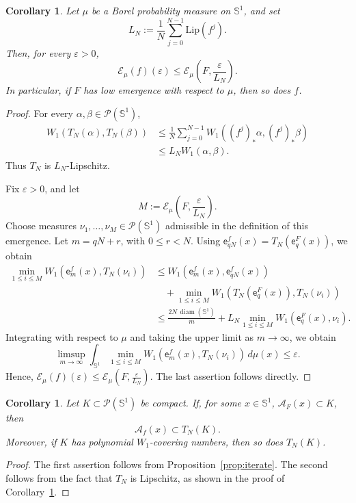 \documentclass[12pt,a4paper,twoside]{article}
\theoremstyle{plain}
\newtheorem{corollary}[theorem]{Corollary}
\theoremstyle{definition}
\newcommand{\cA}{{\mathcal A}}
\newcommand{\cE}{{\mathcal E}}
\newcommand{\cP}{{\mathcal P}}
\newcommand{\Lip}{\textrm{Lip}}
\newcommand{\emp}{\mathsf e}
\newcommand{\Wone}{W_1}
\newcommand{\diam}{\operatorname{diam}}
\newcommand{\Sone}{\mathbb{S}^1}
\begin{document}
\begin{corollary}\label{cor:iterate-emergence}
Let \(\mu\) be a Borel probability measure on \(\Sone\), and set
\[
L_N:=
\frac1N\sum_{j=0}^{N-1}\Lip(f^j).
\]
Then, for every \(\varepsilon>0\),
\[
\cE_\mu(f)(\varepsilon)
\le
\cE_\mu\left(F,\frac{\varepsilon}{L_N}\right).
\]
In particular, if \(F\) has low emergence with respect to \(\mu\), then
so does \(f\).
\end{corollary}

\begin{proof}
For every \(\alpha,\beta\in\cP(\Sone)\),
\[
\begin{aligned}
\Wone(T_N(\alpha),T_N(\beta))
&\le
\frac1N\sum_{j=0}^{N-1}
\Wone((f^j)_*\alpha,(f^j)_*\beta)
\\
&\le
L_N\Wone(\alpha,\beta).
\end{aligned}
\]
Thus \(T_N\) is \(L_N\)-Lipschitz.

Fix \(\varepsilon>0\), and let
\[
M:=
\cE_\mu\left(F,\frac{\varepsilon}{L_N}\right).
\]
Choose measures \(\nu_1,\dots,\nu_M\in\cP(\Sone)\) admissible in the
definition of this emergence. Let \(m=qN+r\), with \(0\le r<N\). Using $\emp_{qN}^f(x)=T_N(\emp_q^F(x))$, we obtain
\[
\begin{aligned}
\min_{1\le i\le M}
\Wone(\emp_m^f(x),T_N(\nu_i))
&\le
\Wone(\emp_m^f(x),\emp_{qN}^f(x))
\\
&\quad+
\min_{1\le i\le M}
\Wone(T_N(\emp_q^F(x)),T_N(\nu_i))
\\
&\le
\frac{2N\,\diam(\Sone)}{m}
+
L_N
\min_{1\le i\le M}
\Wone(\emp_q^F(x),\nu_i).
\end{aligned}
\]
Integrating with respect to \(\mu\) and taking the upper limit as
\(m\to\infty\), we obtain
\[
\limsup_{m\to\infty}
\int_{\Sone}
\min_{1\le i\le M}
\Wone(\emp_m^f(x),T_N(\nu_i))
\,d\mu(x)
\le
\varepsilon.
\]
Hence, $\cE_\mu(f)(\varepsilon)
\le
\cE_\mu\left(F,\frac{\varepsilon}{L_N}\right)$. The last assertion follows directly.

\end{proof}

\begin{corollary}\label{cor:iterate-compact-family}
Let \(K\subset\cP(\Sone)\) be compact. If, for some \(x\in\Sone\), $\cA_F(x)\subset K$, then
\[
\cA_f(x)\subset T_N(K).
\]
Moreover, if \(K\) has polynomial \(\Wone\)-covering numbers, then so
does \(T_N(K)\).
\end{corollary}

\begin{proof}
The first assertion follows from Proposition~\ref{prop:iterate}.
The second follows from the fact that \(T_N\) is Lipschitz, as shown in
the proof of Corollary~\ref{cor:iterate-emergence}.
\end{proof}
	
\end{document}
